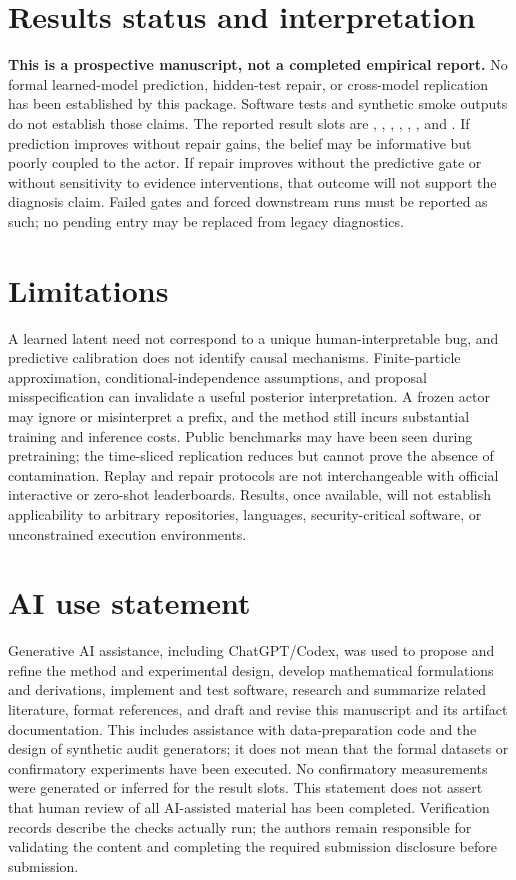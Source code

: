 \documentclass{article}
\begin{document}


\section{Results status and interpretation}
\label{sec:results}
\textbf{This is a prospective manuscript, not a completed empirical report.}
No formal learned-model prediction, hidden-test repair, or cross-model
replication has been established by this package. Software tests and synthetic
smoke outputs do not establish those claims. The reported result slots are
\ResultFiniteAudit, \ResultPrediction, \ResultCalibration, \ResultRepair,
\ResultCoherence, \ResultReplication, and \ResultResources.
If prediction improves without repair gains, the belief may be informative
but poorly coupled to the actor. If repair improves without the predictive
gate or without sensitivity to evidence interventions, that outcome will not
support the diagnosis claim. Failed gates and forced downstream runs must be
reported as such; no pending entry may be replaced from legacy diagnostics.

\section{Limitations}
A learned latent need not correspond to a unique human-interpretable bug, and
predictive calibration does not identify causal mechanisms. Finite-particle
approximation, conditional-independence assumptions, and proposal misspecification
can invalidate a useful posterior interpretation. A frozen actor may ignore
or misinterpret a prefix, and the method still incurs substantial training
and inference costs. Public benchmarks may have been seen during pretraining;
the time-sliced replication reduces but cannot prove the absence of
contamination. Replay and repair protocols are not interchangeable with
official interactive or zero-shot leaderboards. Results, once available,
will not establish applicability to arbitrary repositories, languages,
security-critical software, or unconstrained execution environments.
\label{sec:main-end}

\section*{AI use statement}
Generative AI assistance, including ChatGPT/Codex, was used to propose and
refine the method and experimental design, develop mathematical formulations
and derivations, implement and test software, research and summarize related
literature, format references, and draft and revise this manuscript and its
artifact documentation. This includes assistance with data-preparation code
and the design of synthetic audit generators; it does not mean that the
formal datasets or confirmatory experiments have been executed. No
confirmatory measurements were generated or inferred for the result slots.
This statement does not assert that human review of all AI-assisted material
has been completed. Verification records describe the checks actually run;
the authors remain responsible for validating the content and completing
the required submission disclosure before submission.
\end{document}
